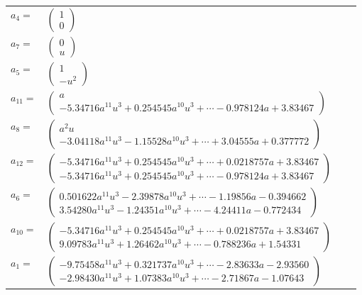 \documentclass[1p]{elsarticle_modified}
\theoremstyle{definition}
\begin{document}
\begin{tabular}{m{7pt} m{180pt} m{7pt} m{180pt} }
\flushright $a_{4}=$&$\begin{pmatrix}1\\0\end{pmatrix}$ \\
\flushright $a_{7}=$&$\begin{pmatrix}0\\u\end{pmatrix}$ \\
\flushright $a_{5}=$&$\begin{pmatrix}1\\- u^2\end{pmatrix}$ \\
\flushright $a_{11}=$&$\begin{pmatrix}a\\-5.34716 a^{11} u^{3}+0.254545 a^{10} u^{3}+\cdots-0.978124 a+3.83467\end{pmatrix}$ \\
\flushright $a_{8}=$&$\begin{pmatrix}a^2 u\\-3.04118 a^{11} u^{3}-1.15528 a^{10} u^{3}+\cdots+3.04555 a+0.377772\end{pmatrix}$ \\
\flushright $a_{12}=$&$\begin{pmatrix}-5.34716 a^{11} u^{3}+0.254545 a^{10} u^{3}+\cdots+0.0218757 a+3.83467\\-5.34716 a^{11} u^{3}+0.254545 a^{10} u^{3}+\cdots-0.978124 a+3.83467\end{pmatrix}$ \\
\flushright $a_{6}=$&$\begin{pmatrix}0.501622 a^{11} u^{3}-2.39878 a^{10} u^{3}+\cdots-1.19856 a-0.394662\\3.54280 a^{11} u^{3}-1.24351 a^{10} u^{3}+\cdots-4.24411 a-0.772434\end{pmatrix}$ \\
\flushright $a_{10}=$&$\begin{pmatrix}-5.34716 a^{11} u^{3}+0.254545 a^{10} u^{3}+\cdots+0.0218757 a+3.83467\\9.09783 a^{11} u^{3}+1.26462 a^{10} u^{3}+\cdots-0.788236 a+1.54331\end{pmatrix}$ \\
\flushright $a_{1}=$&$\begin{pmatrix}-9.75458 a^{11} u^{3}+0.321737 a^{10} u^{3}+\cdots-2.83633 a-2.93560\\-2.98430 a^{11} u^{3}+1.07383 a^{10} u^{3}+\cdots-2.71867 a-1.07643\end{pmatrix}$ \\

\end{tabular}
\end{document}
